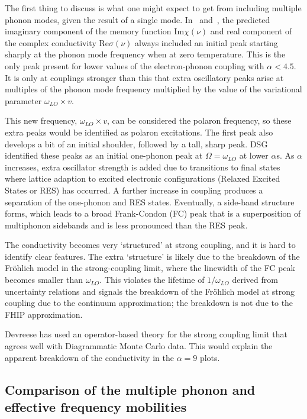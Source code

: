 The first thing to discuss is what one might expect to get from including multiple phonon modes, given the result of a single mode. In~\cite{feynman_mobility_1962} and~\cite{devreese_optical_1972}, the predicted imaginary component of the memory function $\text{Im}\chi(\nu)$ and real component of the complex conductivity $\text{Re}\sigma(\nu)$ always included an initial peak starting sharply at the phonon mode frequency when at zero temperature. This is the only peak present for lower values of the electron-phonon coupling with $\alpha < 4.5$. It is only at couplings stronger than this that extra oscillatory peaks arise at multiples of the phonon mode frequency multiplied by the value of the variational parameter $\omega_{LO} \times v$. 

This new frequency, $\omega_{LO} \times v$, can be considered the polaron frequency, so these extra peaks would be identified as polaron excitations. The first peak also develops a bit of an initial shoulder, followed by a tall, sharp peak. DSG identified these peaks as an initial one-phonon peak at $\Omega = \omega_{LO}$ at lower $\alpha$s. As $\alpha$ increases, extra oscillator strength is added due to transitions to final states where lattice adaption to excited electronic configurations (Relaxed Excited States or RES) has occurred. A further increase in coupling produces a separation of the one-phonon and RES states. Eventually, a side-band structure forms, which leads to a broad Frank-Condon (FC) peak that is a superposition of multiphonon sidebands and is less pronounced than the RES peak. 

The conductivity becomes very `structured' at strong coupling, and it is hard to identify clear features. The extra `structure' is likely due to the breakdown of the Fr\"ohlich model in the strong-coupling limit, where the linewidth of the FC peak becomes smaller than $\omega_{LO}$. This violates the lifetime of $1 / \omega_{LO}$ derived from uncertainty relations and signals the breakdown of the Fr\"ohlich model at strong coupling due to the continuum approximation; the breakdown is not due to the FHIP approximation. 

Devreese has used an operator-based theory \cite{Devreese2001} for the strong coupling limit that agrees well with Diagrammatic Monte Carlo data. This would explain the apparent breakdown of the conductivity in the $\alpha = 9$ plots. 

\subsection{Comparison of the multiple phonon and effective frequency mobilities}

